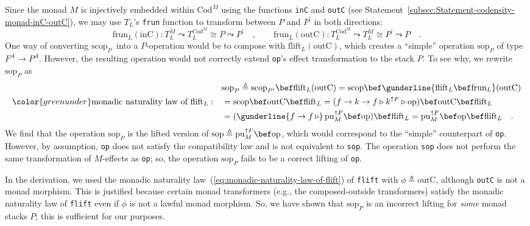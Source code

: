 Since the monad $M$ is injectively embedded within $\text{Cod}^{M}$
using the functions \lstinline!inC! and \lstinline!outC! (see Statement~\ref{subsec:Statement-codensity-monad-inC-outC}),
we may use $T_{L}$\textsf{'}s \lstinline!frun! function to transform between
$P$ and $P^{\prime}$ in both directions:
\[
\text{frun}_{L}(\text{inC}):T_{L}^{M}\leadsto T_{L}^{\text{Cod}^{M}}\cong P\leadsto P^{\prime}\quad,\quad\quad\text{frun}_{L}(\text{outC}):T_{L}^{\text{Cod}^{M}}\leadsto T_{L}^{M}\cong P^{\prime}\leadsto P\quad.
\]
One way of converting $\text{scop}_{P^{\prime}}$ into a $P$-operation
would be to compose with $\text{flift}_{L}(\text{outC})$, which creates
a \textsf{``}simple\textsf{''} operation $\text{sop}_{P}$ of type $F^{A}\rightarrow P^{A}$.
However, the resulting operation would not correctly extend \lstinline!op!\textsf{'}s
effect transformation to the stack $P$. To see why, we rewrite $\text{sop}_{P}$
as
\begin{align*}
 & \text{sop}_{P}\triangleq\text{scop}_{P^{\prime}}\bef\text{flift}_{L}(\text{outC})=\text{scop}\bef\gunderline{\text{flift}_{L}\bef\text{frun}_{L}}(\text{outC})\\
{\color{greenunder}\text{monadic naturality law of }\text{flift}_{L}:}\quad & =\text{scop}\bef\text{outC}\bef\text{flift}_{L}=(f\rightarrow k\rightarrow f\triangleright k^{\uparrow F}\triangleright\text{op})\bef\text{outC}\bef\text{flift}_{L}\\
 & =(\gunderline{f\rightarrow f\,\triangleright}\,\text{pu}_{M}^{\uparrow F}\bef\text{op})\bef\text{flift}_{L}=\text{pu}_{M}^{\uparrow F}\bef\text{op}\bef\text{flift}_{L}\quad.
\end{align*}
We find that the operation $\text{sop}_{P}$ is the lifted version
of $\text{sop}\triangleq\text{pu}_{M}^{\uparrow F}\bef\text{op}$,
which would correspond to the \textsf{``}simple\textsf{''} counterpart of \lstinline!op!.
However, by assumption, \lstinline!op! does not satisfy the compatibility
law and is not equivalent to \lstinline!sop!. The operation \lstinline!sop!
does not perform the same transformation of $M$-effects as \lstinline!op!;
so, the operation $\text{sop}_{P}$ fails to be a correct lifting
of \lstinline!op!.

In the derivation, we used the monadic naturality law~(\ref{eq:monadic-naturality-law-of-flift})
of \lstinline!flift! with $\phi\triangleq\text{outC}$, although
\lstinline!outC! is not a monad morphism. This is justified because
certain monad transformers (e.g., the composed-outside transformers)
satisfy the monadic naturality law of \lstinline!flift! even if $\phi$
is not a lawful monad morphism. So, we have shown that $\text{sop}_{P}$
is an incorrect lifting for \emph{some} monad stacks $P$; this is
sufficient for our purposes.

